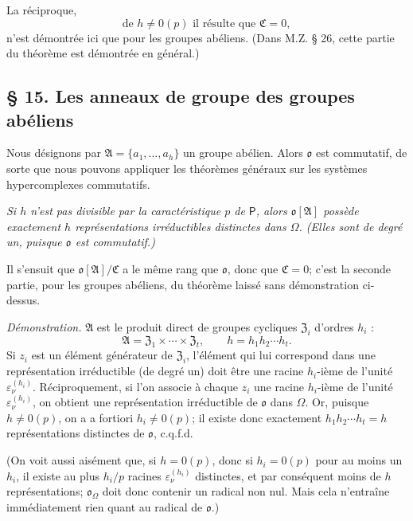 La réciproque,
\[
\text{de } h\ne0(p) \text{ il résulte que } \mathfrak C=0,
\]
n'est démontrée ici que pour les groupes abéliens. (Dans M.Z. \S{} 26, cette partie du théorème est démontrée en général.)

\subsection*{\S{} 15. Les anneaux de groupe des groupes abéliens}\label{fr-r823-anneaux-de-groupe-groupes-abeliens}

Nous désignons par \(\mathfrak A=\{a_1,\ldots,a_h\}\) un groupe abélien. Alors \(\mathfrak o\) est commutatif, de sorte que nous pouvons appliquer les théorèmes généraux sur les systèmes hypercomplexes commutatifs.

\emph{Si \(h\) n'est pas divisible par la caractéristique \(p\) de \(\mathsf P\), alors \(\mathfrak o[\mathfrak A]\) possède exactement \(h\) représentations irréductibles distinctes dans \(\Omega\). (Elles sont de degré un, puisque \(\mathfrak o\) est commutatif.)}

Il s'ensuit que \(\mathfrak o[\mathfrak A]/\mathfrak C\) a le même rang que \(\mathfrak o\), donc que \(\mathfrak C=0\); c'est la seconde partie, pour les groupes abéliens, du théorème laissé sans démonstration ci-dessus.

\emph{Démonstration.} \(\mathfrak A\) est le produit direct de groupes cycliques \(\mathfrak Z_i\) d'ordres \(h_i\) :
\[
\mathfrak A=\mathfrak Z_1\times\cdots\times\mathfrak Z_t,
\qquad
h=h_1h_2\cdots h_t .
\]
Si \(z_i\) est un élément générateur de \(\mathfrak Z_i\), l'élément qui lui correspond dans une représentation irréductible (de degré un) doit être une racine \(h_i\)-ième de l'unité \(\varepsilon_\nu^{(h_i)}\). Réciproquement, si l'on associe à chaque \(z_i\) une racine \(h_i\)-ième de l'unité \(\varepsilon_\nu^{(h_i)}\), on obtient une représentation irréductible de \(\mathfrak o\) dans \(\Omega\). Or, puisque \(h\ne0(p)\), on a a fortiori \(h_i\ne0(p)\); il existe donc exactement \(h_1h_2\cdots h_t=h\) représentations distinctes de \(\mathfrak o\), c.q.f.d.

(On voit aussi aisément que, si \(h=0(p)\), donc si \(h_i=0(p)\) pour au moins un \(h_i\), il existe au plus \(h_i/p\) racines \(\varepsilon_\nu^{(h_i)}\) distinctes, et par conséquent moins de \(h\) représentations; \(\mathfrak o_\Omega\) doit donc contenir un radical non nul. Mais cela n'entraîne immédiatement rien quant au radical de \(\mathfrak o\).)

